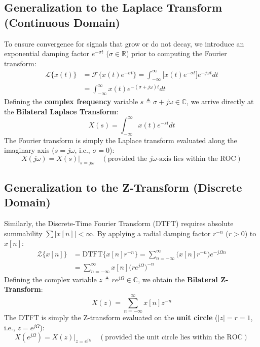\documentclass[12pt,a4paper]{article}
\begin{document}
\subsection{Generalization to the Laplace Transform (Continuous Domain)}
To ensure convergence for signals that grow or do not decay, we introduce an exponential damping factor $e^{-\sigma t}$ ($\sigma \in \mathbb{R}$) prior to computing the Fourier transform:
\begin{align}
  \mathcal{L}\{x(t)\} &= \mathcal{F}\{x(t) e^{-\sigma t}\} = \int_{-\infty}^{\infty} \big[x(t) e^{-\sigma t}\big] e^{-j\omega t} dt \\
  &= \int_{-\infty}^{\infty} x(t) e^{-(\sigma + j\omega) t} dt
\end{align}
Defining the \textbf{complex frequency} variable $s \triangleq \sigma + j\omega \in \mathbb{C}$, we arrive directly at the \textbf{Bilateral Laplace Transform}:
\begin{equation}
  X(s) = \int_{-\infty}^{\infty} x(t) e^{-st} dt
\end{equation}
The Fourier transform is simply the Laplace transform evaluated along the imaginary axis ($s = j\omega$, i.e., $\sigma = 0$):
\begin{equation}
  X(j\omega) = \left. X(s) \right|_{s = j\omega} \quad (\text{provided the } j\omega\text{-axis lies within the ROC})
\end{equation}

\subsection{Generalization to the Z-Transform (Discrete Domain)}
Similarly, the Discrete-Time Fourier Transform (DTFT) requires absolute summability $\sum |x[n]| < \infty$. By applying a radial damping factor $r^{-n}$ ($r > 0$) to $x[n]$:
\begin{align}
  \mathcal{Z}\{x[n]\} &= \text{DTFT}\{x[n] r^{-n}\} = \sum_{n=-\infty}^{\infty} \big(x[n] r^{-n}\big) e^{-j\Omega n} \\
  &= \sum_{n=-\infty}^{\infty} x[n] \big(r e^{j\Omega}\big)^{-n}
\end{align}
Defining the complex variable $z \triangleq r e^{j\Omega} \in \mathbb{C}$, we obtain the \textbf{Bilateral Z-Transform}:
\begin{equation}
  X(z) = \sum_{n=-\infty}^{\infty} x[n] z^{-n}
\end{equation}
The DTFT is simply the Z-transform evaluated on the \textbf{unit circle} ($|z| = r = 1$, i.e., $z = e^{j\Omega}$):
\begin{equation}
  X(e^{j\Omega}) = \left. X(z) \right|_{z = e^{j\Omega}} \quad (\text{provided the unit circle lies within the ROC})
\end{equation}
\end{document}
